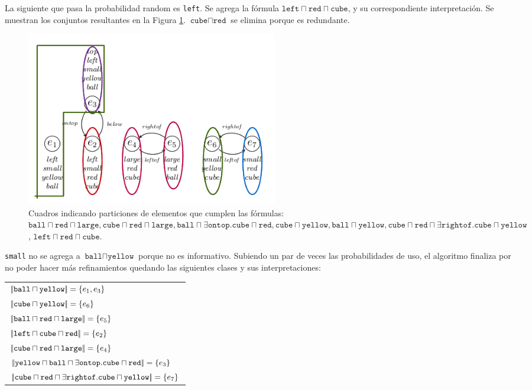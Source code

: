 La siguiente que pasa la probabilidad random es \texttt{left}. Se agrega la f\'ormula $\texttt{left} \sqcap \texttt{red} \sqcap \texttt{cube}$, y su correspondiente interpretaci\'on. Se muestran los conjuntos resultantes en la Figura \ref{fig-modelo9f}. $\texttt{cube} \sqcap \texttt{red}$ se elimina porque es redundante.

\begin{figure}[H]
\begin{center}
\includegraphics[width=11cm]{images/im/left.png}
\caption{Cuadros indicando particiones de elementos que cumplen las f\'ormulas: $\texttt{ball} \sqcap \texttt{red} \sqcap \texttt{large}, \texttt{cube} \sqcap \texttt{red} \sqcap \texttt{large},\texttt{ball} \sqcap \exists \texttt{ontop}. \texttt{cube} \sqcap \texttt{red}, \texttt{cube} \sqcap \texttt{yellow}, \texttt{ball} \sqcap \texttt{yellow}, \texttt{cube} \sqcap \texttt{red} \sqcap \exists \texttt{rightof}. \texttt{cube} \sqcap \texttt{yellow}$, $\texttt{left} \sqcap \texttt{red} \sqcap \texttt{cube}$.}
\label{fig-modelo9f}
\end{center}
\end{figure}

\texttt{small} no se agrega a $\texttt{ball} \sqcap \texttt{yellow}$ porque no es informativo. 
Subiendo un par de veces las probabilidades de uso, el algoritmo finaliza por no poder hacer m\'as refinamientos quedando las siguientes clases y sus interpretaciones:

\begin{tabular}{l}
$|\!|\texttt{ball} \sqcap \texttt{yellow}|\!| = \{e_1, e_3\}$  \\
$|\!|\texttt{cube} \sqcap \texttt{yellow} |\!|= \{e_6\}$ \\
$|\!|\texttt{ball} \sqcap \texttt{red} \sqcap \texttt{large}|\!| = \{e_5\}$ \\
$|\!|\texttt{left} \sqcap \texttt{cube} \sqcap \texttt{red}|\!| = \{e_2\}$ \\
$|\!|\texttt{cube} \sqcap \texttt{red} \sqcap \texttt{large}|\!| = \{e_4\}$  \\
$|\!|\texttt{yellow} \sqcap \texttt{ball} \sqcap \exists \texttt{ontop}.\texttt{cube} \sqcap \texttt{red}|\!| = \{e_3\}$ \\ 
$|\!|\texttt{cube} \sqcap \texttt{red} \sqcap \exists \texttt{rightof}. \texttt{cube} \sqcap \texttt{yellow}|\!| = \{e_7\}$
\end{tabular}

